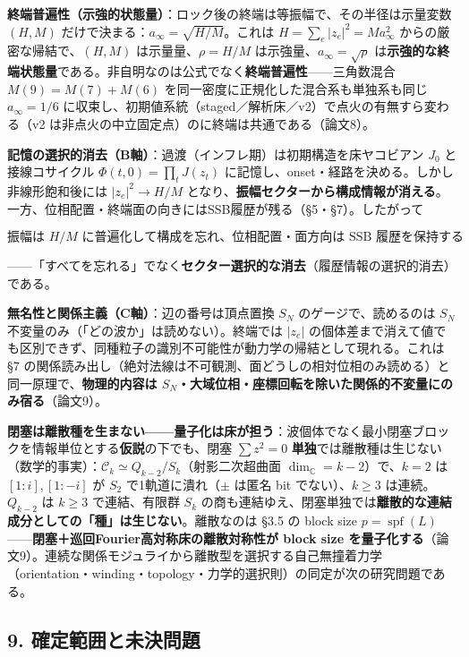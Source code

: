 \documentclass[
  a4paper,
]{ltjsarticle}
\begin{document}
\textbf{終端普遍性（示強的状態量）}：ロック後の終端は等振幅で、その半径は示量変数
\((H,M)\) だけで決まる：\(a_\infty=\sqrt{H/M}\)。これは
\(H=\sum_e|z_e|^2=Ma_\infty^2\) からの厳密な帰結で、\((H,M)\)
は示量量、\(\rho=H/M\) は示強量、\(a_\infty=\sqrt\rho\)
は\textbf{示強的な終端状態量}である。非自明なのは公式でなく\textbf{終端普遍性}------三角数混合
\(M(9)=M(7)+M(6)\) を同一密度に正規化した混合系も単独系も同じ
\(a_\infty=1/6\)
に収束し、初期値系統（staged／解析床／v2）で点火の有無すら変わる（v2
は非点火の中立固定点）のに終端は共通である（論文8）。

\textbf{記憶の選択的消去（B軸）}：過渡（インフレ期）は初期構造を床ヤコビアン
\(J_0\) と接線コサイクル \(\Phi(t,0)=\prod_t J(z_t)\)
に記憶し、onset・経路を決める。しかし非線形飽和後には \(|z_e|^2\to H/M\)
となり、\textbf{振幅セクターから構成情報が消える}。一方、位相配置・終端面の向きにはSSB履歴が残る（§5・§7）。したがって

\[\boxed{\text{振幅は }H/M\text{ に普遍化して構成を忘れ、位相配置・面方向は SSB 履歴を保持する}}\]

------「すべてを忘れる」でなく\textbf{セクター選択的な消去}（履歴情報の選択的消去）である。

\textbf{無名性と関係主義（C軸）}：辺の番号は頂点置換 \(S_N\)
のゲージで、読めるのは \(S_N\)
不変量のみ（「どの波か」は読めない）。終端では \(|z_e|\)
の個体差まで消えて値でも区別できず、同種粒子の識別不可能性が動力学の帰結として現れる。これは
§7
の関係読み出し（絶対法線は不可観測、面どうしの相対位相のみ読める）と同一原理で、\textbf{物理的内容は
\(S_N\)・大域位相・座標回転を除いた関係的不変量にのみ宿る}（論文9）。

\textbf{閉塞は離散種を生まない------量子化は床が担う}：波個体でなく最小閉塞ブロックを情報単位とする\textbf{仮説}の下でも、閉塞
\(\sum z^2=0\)
\textbf{単独}では離散種は生じない（数学的事実）：\(\mathcal C_k\simeq Q_{k-2}/S_k\)（射影二次超曲面
\(\dim_{\mathbb C}=k-2\)）で、\(k=2\) は \([1{:}i],[1{:}{-}i]\) が
\(S_2\) で1軌道に潰れ（\(\pm\) は匿名 bit でない）、\(k\ge3\)
は連続。\(Q_{k-2}\) は \(k\ge3\) で連結、有限群 \(S_k\)
の商も連結ゆえ、閉塞単独では\textbf{離散的な連結成分としての「種」は生じない}。離散なのは
§3.5 の block size
\(p=\operatorname{spf}(L)\)------\textbf{閉塞＋巡回Fourier高対称床の離散対称性が
block size
を量子化する}（論文9）。連続な関係モジュライから離散型を選択する自己無撞着力学（orientation・winding・topology・力学的選択則）の同定が次の研究問題である。

\subsection{9.
確定範囲と未決問題}\label{ux78baux5b9aux7bc4ux56f2ux3068ux672aux6c7aux554fux984c}
\end{document}
